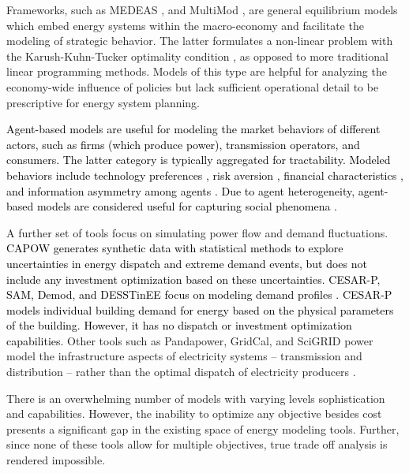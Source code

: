 Frameworks, such as MEDEAS \cite{capellan-perez_medeas_2020}, and MultiMod
\cite{huppmann_market_2014}, are general equilibrium models which embed energy
systems within the macro-economy and facilitate the modeling of strategic
behavior. The latter formulates a non-linear problem with the Karush-Kuhn-Tucker
optimality condition \cite{huppmann_market_2014}, as opposed to more traditional
linear programming methods. Models of this type are helpful for analyzing the
economy-wide influence of policies but lack sufficient operational detail to be
prescriptive for energy system planning.

\textcolor{black}{Agent-based models are useful for modeling the market
behaviors of different actors, such as firms (which produce power), transmission
operators, and consumers. The latter category is typically aggregated for
tractability. Modeled behaviors include technology preferences
\cite{anwar_modeling_2022, zade_quantifying_2020}, risk aversion
\cite{anwar_modeling_2022}, financial characteristics \cite{anwar_modeling_2022,
nitsch_economic_2021}, and information asymmetry among agents
\cite{anwar_modeling_2022, nitsch_economic_2021}. Due to agent heterogeneity,
agent-based models are considered useful for capturing social phenomena
\cite{yue_review_2018,fattahi_systemic_2020}.}

A further set of tools focus on simulating power flow and demand fluctuations.
\textcolor{black}{CAPOW \cite{su_open_2020} generates synthetic data with
statistical methods to explore uncertainties in energy dispatch and extreme
demand events, but does not include any investment optimization based on these
uncertainties.} \textcolor{black}{CESAR-P, SAM, Demod, and DESSTinEE focus on
modeling demand profiles
\cite{leoniefierz_hues-platformcesar-p-core_2021,bosmann_shape_2015,barsanti_socio-technical_2021}.
CESAR-P models individual building demand for energy based on the physical
parameters of the building. However, it has no dispatch or investment
optimization capabilities.} Other tools such as Pandapower, GridCal, and SciGRID
power model the infrastructure aspects of electricity systems -- transmission
and distribution -- rather than the optimal dispatch of electricity producers
\cite{thurner_pandapower_2018, vera_gridcal_2022, matke_structure_2017}.

There is an overwhelming number of models with varying levels sophistication and
capabilities. However, the inability to optimize any objective besides cost
presents a significant gap in the existing space of energy modeling tools.
Further, since none of these tools allow for multiple objectives, true trade off
analysis is rendered impossible.



